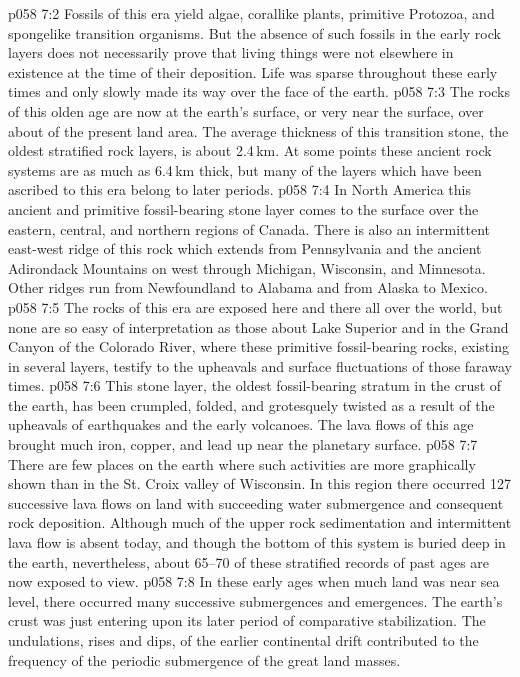 \vs p058 7:2 Fossils of this era yield algae, corallike plants, primitive Protozoa, and spongelike transition organisms. But the absence of such fossils in the early rock layers does not necessarily prove that living things were not elsewhere in existence at the time of their deposition. Life was sparse throughout these early times and only slowly made its way over the face of the earth.
\vs p058 7:3 \pc The rocks of this olden age are now at the earth’s surface, or very near the surface, over about  of the present land area. The average thickness of this transition stone, the oldest stratified rock layers, is about 2.4\,km. At some points these ancient rock systems are as much as 6.4\,km thick, but many of the layers which have been ascribed to this era belong to later periods.
\vs p058 7:4 In North America this ancient and primitive fossil\hyp{}bearing stone layer comes to the surface over the eastern, central, and northern regions of Canada. There is also an intermittent east\hyp{}west ridge of this rock which extends from Pennsylvania and the ancient Adirondack Mountains on west through Michigan, Wisconsin, and Minnesota. Other ridges run from Newfoundland to Alabama and from Alaska to Mexico.
\vs p058 7:5 The rocks of this era are exposed here and there all over the world, but none are so easy of interpretation as those about Lake Superior and in the Grand Canyon of the Colorado River, where these primitive fossil\hyp{}bearing rocks, existing in several layers, testify to the upheavals and surface fluctuations of those faraway times.
\vs p058 7:6 This stone layer, the oldest fossil\hyp{}bearing stratum in the crust of the earth, has been crumpled, folded, and grotesquely twisted as a result of the upheavals of earthquakes and the early volcanoes. The lava flows of this age brought much iron, copper, and lead up near the planetary surface.
\vs p058 7:7 There are few places on the earth where such activities are more graphically shown than in the St. Croix valley of Wisconsin. In this region there occurred 127 successive lava flows on land with succeeding water submergence and consequent rock deposition. Although much of the upper rock sedimentation and intermittent lava flow is absent today, and though the bottom of this system is buried deep in the earth, nevertheless, about 65--70 of these stratified records of past ages are now exposed to view.
\vs p058 7:8 \pc In these early ages when much land was near sea level, there occurred many successive submergences and emergences. The earth’s crust was just entering upon its later period of comparative stabilization. The undulations, rises and dips, of the earlier continental drift contributed to the frequency of the periodic submergence of the great land masses.
